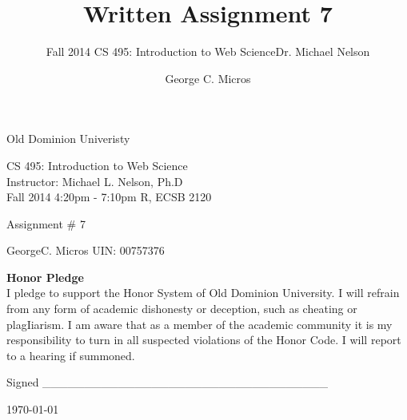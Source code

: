 \documentclass[]{svmono}
\begin{document}
\begin{titlepage}    
\begin{center}
\vspace*{0in}
\huge{\sc  Old Dominion Univeristy\\  }



\vspace{1in}
\Large{\sc CS 495: Introduction to Web Science \\ Instructor: Michael L. Nelson, Ph.D \\ Fall 2014 4:20pm - 7:10pm R, ECSB 2120\\}

\vspace{1in}
\Large{Assignment \# 7\\}

\vspace{.5cm}
\Large{ \sc GeorgeC.  Micros  UIN: 00757376\\ }



\vspace {7cm}

{\large \bf {Honor Pledge}}\\
{I pledge to support the Honor System of Old Dominion University. I will refrain from any form of academic dishonesty or deception, such as cheating or plagIiarism. I am aware that as a member of the academic community it is my responsibility to turn in all suspected violations of the Honor Code. I will report to a hearing if summoned. }\\
\vspace {.5cm}

{Signed \_\_\_\_\_\_\_\_\_\_\_\_\_\_\_\_\_\_\_\_\_\_\_\_\_\_\_\_\_\_\_\_\_\_}


\today
\end{center}
\end{titlepage}



\author{George C. Micros}
\title{Written Assignment 7}
\subtitle{Fall 2014 \newline  CS 495: Introduction to Web Science\newline Dr. Michael Nelson}
\maketitle


\tableofcontents
\end{document}
